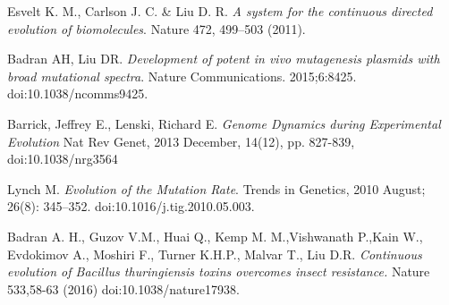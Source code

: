\documentclass[10pt,letterpaper]{article}
\begin{document}



\nolinenumbers

\begin{thebibliography}{10}

Esvelt K. M., Carlson J. C. \& Liu D. R.
\newblock \textit{A system for the continuous directed evolution of biomolecules}.
\newblock Nature 472, 499–503 (2011).

Badran AH, Liu DR.
\newblock \textit{{D}evelopment of potent in vivo mutagenesis plasmids with broad mutational spectra}.
\newblock Nature Communications. 2015;6:8425. doi:10.1038/ncomms9425.

Barrick, Jeffrey E., Lenski, Richard E.
\newblock \textit{{G}enome Dynamics during Experimental Evolution}
\newblock  Nat Rev Genet, 2013 December, 14(12), pp. 827-839, doi:10.1038/nrg3564

Lynch M.
\newblock \textit{{E}volution of the Mutation Rate}.
\newblock Trends in Genetics, 2010 August; 26(8): 345–352. doi:10.1016/j.tig.2010.05.003.

  Badran A. H., Guzov V.M., Huai Q., Kemp M. M.,Vishwanath P.,Kain W., Evdokimov A., Moshiri F., Turner K.H.P., Malvar T., Liu D.R.
  \newblock \textit{{C}ontinuous evolution of Bacillus thuringiensis toxins overcomes insect resistance.}
  \newblock  Nature 533,58-63 (2016) doi:10.1038/nature17938.

\end{thebibliography}

\end{document}
